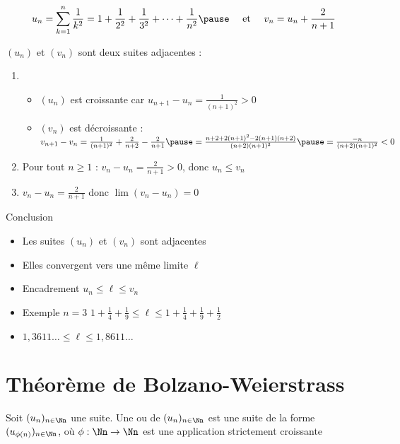 \begin{frame}


\vspace*{-1ex}
$$u_n = \sum_{k=1}^n \frac 1 {k^2} = 1+\frac{1}{2^2} +\frac{1}{3^2}+\cdots+\frac{1}{n^2}
\pause 
\quad \text{ et } \quad v_n = u_n + \frac2{n+1}$$

\pause
\medskip
$(u_n)$ et $(v_n)$ sont deux suites adjacentes :
\medskip
\pause
\begin{enumerate}
  \item 
  \begin{itemize}
    \item $(u_n)$ est croissante car $u_{n+1}-u_n = \frac{1}{(n+1)^2} > 0$
\pause    
    \item $(v_n)$ est décroissante :
    $v_{n+1}-v_n = \frac{1}{(n+1)^2} + \frac{2}{n+2} - \frac{2}{n+1} 
\pause  = \frac{n+2+2(n+1)^2-2(n+1)(n+2)}{(n+2)(n+1)^2} 
\pause  = \frac{-n}{(n+2)(n+1)^2}< 0$
  \end{itemize}
\pause   
  \item Pour tout $n\ge 1$ : $v_n-u_n = \frac{2}{n+1} >0$, \pause donc $u_n \le v_n$
\pause 
  \item $v_n-u_n = \frac{2}{n+1}$  \pause donc $\lim (v_n-u_n) = 0$
\end{enumerate}

\pause  
\bigskip

Conclusion
\begin{itemize}
  \item Les suites $(u_n)$ et $(v_n)$ sont adjacentes
\pause    
  \item Elles convergent vers une même limite $\ell$
\pause    
  \item Encadrement $u_n \le \ell \le v_n$
\pause    
  \item Exemple $n=3$ \quad $1+\frac{1}{4} +\frac{1}{9} \le \ell \le 1+\frac{1}{4} +\frac{1}{9} + \frac{1}{2}$
\pause   
  \item $1,3611\ldots \le \ell \le 1,8611\ldots$
\end{itemize}

\end{frame}

\section{Théorème de Bolzano-Weierstrass}

\begin{frame}
\begin{mydefinition}
Soit $(u_n)_{n\in \Nn}$ une suite. Une  ou  
 de $(u_n)_{n\in \Nn}$ est une suite de la forme 
$(u_{\phi(n)})_{n\in \Nn}$, où $\phi : \Nn \to \Nn$ est une application strictement croissante
\end{mydefinition}



\end{frame}


